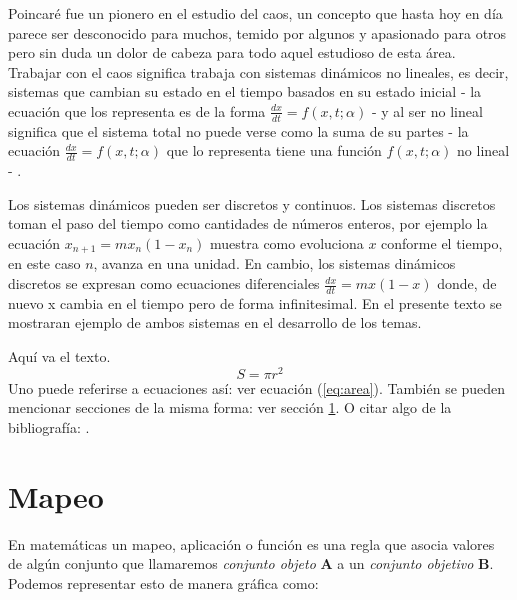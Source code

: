 \documentclass[11pt,twocolumn,spanish]{article}
\theoremstyle{definition}
\theoremstyle{remark}
\begin{document}
Poincaré fue un pionero en el estudio del caos, un concepto que hasta hoy en día parece ser desconocido para muchos, temido por algunos y apasionado para otros pero sin duda un dolor de cabeza para todo aquel estudioso de esta área. Trabajar con el caos significa trabaja con sistemas dinámicos no lineales, es decir, sistemas que cambian su estado en el tiempo basados en su estado inicial - la ecuación que los representa es de la forma $ \frac{dx}{dt} = f(x,t;\alpha)$ - y al ser no lineal significa que el sistema total no puede verse como la suma de su partes - la ecuación $ \frac{dx}{dt} = f(x,t;\alpha)$ que lo representa tiene una función $f(x,t;\alpha)$ no lineal -  . 

Los sistemas dinámicos pueden ser discretos y continuos.  Los sistemas discretos toman el paso del tiempo como cantidades de números enteros, por ejemplo la ecuación $x_{n+1} = mx_{n}(1-x_{n})$ muestra como evoluciona $x$ conforme el tiempo, en este caso  $n$, avanza en una unidad. En cambio, los sistemas dinámicos discretos se expresan como ecuaciones diferenciales $\frac{dx}{dt} = mx(1-x)$ donde, de nuevo x cambia en el tiempo pero de forma infinitesimal. En el presente texto se mostraran ejemplo de ambos sistemas en el desarrollo de los temas. 

Aquí va el texto.
\begin{equation}\label{eq:area}
  S = \pi r^2
\end{equation}
Uno puede referirse a ecuaciones así: ver ecuación (\ref{eq:area}).
También se pueden mencionar secciones de la misma forma: ver sección
\ref{sec:nada}. O citar algo de la bibliografía: \cite{Cd94}.

\section{Mapeo}\label{sec:nada}

En matemáticas un mapeo, aplicación o  función es una regla que asocia valores de algún conjunto que llamaremos \textit{conjunto objeto} \textbf{A} a un \textit{conjunto objetivo} \textbf{B}. Podemos representar esto de manera gráfica como:
\end{document}
